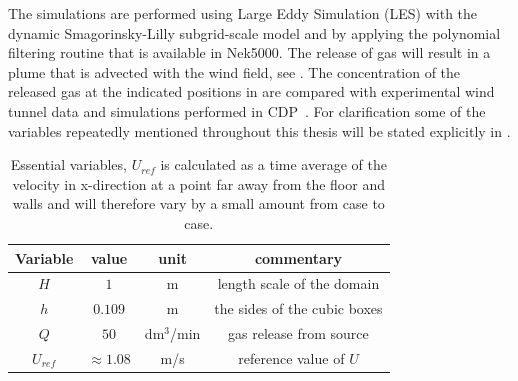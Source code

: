 The simulations are performed using Large Eddy Simulation (LES) 
with the dynamic Smagorinsky-Lilly subgrid-scale model and by applying the polynomial filtering
routine that is available in Nek5000. 
The release of gas will result in a plume that is advected with the wind field,
see . The concentration of the released gas at the 
indicated positions in  are compared with 
experimental wind tunnel data and simulations performed in CDP~\cite{CDP}. 
For clarification some of the variables repeatedly mentioned throughout this thesis will be 
stated explicitly in .
\begin{table}
    \centering
    \begin{tabular}{c c c c}
        Variable & value & unit & commentary \\ \hline
        $H$   & $1$ & m & length scale of the domain \\ 
        $h$   & $0.109$ & m & the sides of the cubic boxes\\ 
        $Q$   & $50$ & dm$^3$/min & gas release from source \\ 
        $U_{ref} $& $\approx1.08$ & m/s & reference value of $U$ \\
    \end{tabular}
    \caption{Essential variables, $U_{ref}$ is calculated as a time average of the velocity in 
        x-direction at a point far away from the floor and walls and will therefore 
        vary by a small amount from case to case. }
    \label{tab:simplevariables}
\end{table}

